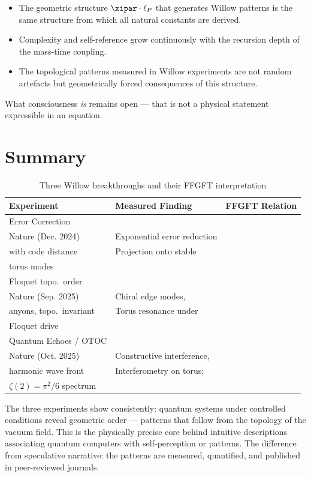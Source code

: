 \begin{conclusionBox}
\begin{itemize}
    \item The geometric structure $\xipar \cdot \ell_P$ that generates Willow patterns
    is the same structure from which all natural constants are derived.
    \item Complexity and self-reference grow continuously with the recursion depth of
    the mass-time coupling.
    \item The topological patterns measured in Willow experiments are not random
    artefacts but geometrically forced consequences of this structure.
\end{itemize}
What consciousness \textit{is} remains open — that is not a physical statement
expressible in an equation.
\end{conclusionBox}


\section{Summary}

\begin{table}[ht]
\centering
\begin{tabular}{|p{3.2cm}|p{4.8cm}|p{4.2cm}|}
\hline
\textbf{Experiment} & \textbf{Measured Finding} & \textbf{FFGFT Relation} \\
\hline
Error Correction\\Nature (Dec. 2024) &
Exponential error reduction\\with code distance &
Projection onto stable\\torus modes \\
\hline
Floquet topo.\ order\\Nature (Sep. 2025) &
Chiral edge modes,\\anyons, topo.\ invariant &
Torus resonance under\\Floquet drive \\
\hline
Quantum Echoes / OTOC\\Nature (Oct. 2025) &
Constructive interference,\\harmonic wave front &
Interferometry on torus;\\$\zeta(2) = \pi^2/6$ spectrum \\
\hline
\end{tabular}
\caption{Three Willow breakthroughs and their FFGFT interpretation}
\end{table}

The three experiments show consistently: quantum systems under controlled conditions
reveal geometric order — patterns that follow from the topology of the vacuum field.
This is the physically precise core behind intuitive descriptions associating quantum
computers with self-perception or patterns. The difference from speculative narrative:
the patterns are measured, quantified, and published in peer-reviewed journals.

